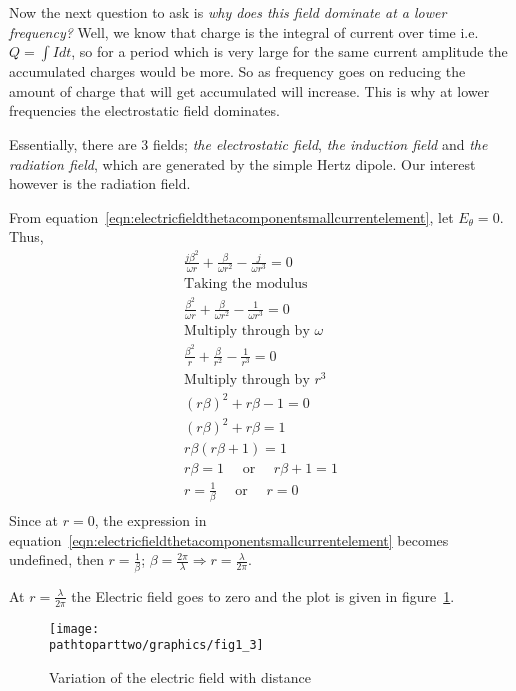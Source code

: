 Now the next question to ask is \emph{why does this field dominate at a lower frequency?} Well, we know that charge is the integral of current over time i.e. $Q =\int Idt$, so for a period which is very large for the same current amplitude the accumulated charges would be more. So as frequency goes on reducing the amount of charge that will get accumulated will increase. This is why at lower frequencies the electrostatic field dominates.

Essentially, there are 3 fields; \emph{the electrostatic field}, \emph{the induction field} and \emph{the radiation field}, which are generated by the simple Hertz dipole. Our interest however is the radiation field. 

From equation~\eqref{eqn:electricfieldthetacomponentsmallcurrentelement}, let $E_{\theta} = 0$. Thus,
\begin{align*}
&\frac{j\beta^2}{\omega r} + \frac{\beta}{\omega r^2} - \frac{j}{\omega r^3} = 0&\\
&\text{Taking the modulus}&\\
&\frac{\beta^2}{\omega r} + \frac{\beta}{\omega r^2} - \frac{1}{\omega r^3} = 0&\\
&\text{Multiply through by $\omega$}&\\
&\frac{\beta^2}{r} + \frac{\beta}{r^2} - \frac{1}{r^3} = 0&\\
&\text{Multiply through by $r^3$}&\\
&(r\beta)^2 + r\beta - 1 = 0&\\
&(r\beta)^2 + r\beta = 1&\\
&r\beta(r\beta + 1) = 1&\\
&r\beta = 1\quad\text{ or }\quad r\beta + 1 = 1&\\
&r = \frac{1}{\beta}\quad\text{ or }\quad r = 0&\\
\end{align*}
Since at $ r = 0$, the expression in equation~\eqref{eqn:electricfieldthetacomponentsmallcurrentelement} becomes undefined, then $ r = \frac{1}{\beta} $; $\beta = \frac{2\pi}{\lambda} \Longrightarrow r =  \frac{\lambda}{2 \pi} $.

At $ r =  \frac{\lambda}{2 \pi} $ the Electric field goes to zero and the plot is given in figure~\ref{fig:electricfiedvariationwithdistance}.
\begin{figure}[h]
\centering
\texttt{[image: \\pathtoparttwo/graphics/fig1\_3]}
\caption{Variation of the electric field with distance}
\label{fig:electricfiedvariationwithdistance}
\end{figure}


